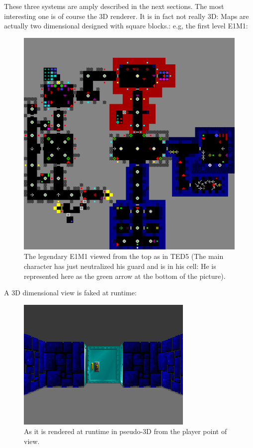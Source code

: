 \documentclass[book.tex]{subfiles}
\begin{document}
 
These three systems are amply described in the next sections. The most interesting one is of course the 3D renderer. It is in fact not really 3D: Maps are actually two dimensional designed with square blocks.: e.g, the first level E1M1:\par
\begin{figure}[H]
  \centering
 \includegraphics[width=\textwidth]{imgs/e1m1.png}
 \caption{The legendary E1M1 viewed from the top as in TED5 (The main character has just neutralized his guard and is in his cell: He is represented here as the green arrow at the bottom of the picture).}
\end{figure}
\par 
A 3D dimensional view is faked at runtime:

\begin{figure}[H]
  \centering
 \includegraphics[width=\textwidth]{imgs/ray_caster_explained/beginning.png}
 \caption{As it is rendered at runtime in pseudo-3D from the player point of view.} 
\end{figure}
\end{document}
